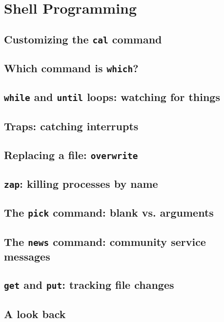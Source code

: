 \chapter{Shell Programming}
\section{Customizing the \texttt{cal} command}
\section{Which command is \texttt{which}?}
\section{\texttt{while} and \texttt{until} loops: watching for things}
\section{Traps: catching interrupts}
\section{Replacing a file: \texttt{overwrite}}
\section{\texttt{zap}: killing processes by name}
\section{The \texttt{pick} command: blank vs. arguments}
\section{The \texttt{news} command: community service messages}
\section{\texttt{get} and \texttt{put}: tracking file changes}
\section{A look back}
